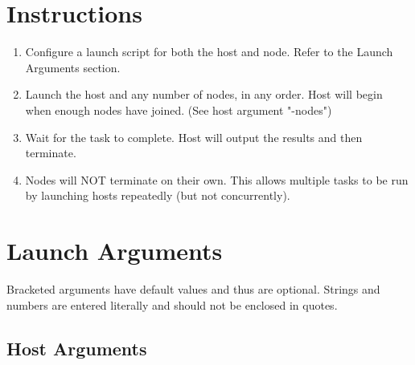 \documentclass[]{article}
\begin{document}
\section{Instructions}
\begin{enumerate}
	\item Configure a launch script for both the host and node. Refer to the Launch Arguments section.
	\item Launch the host and any number of nodes, in any order. Host will begin when enough nodes have joined. (See host argument "-nodes")
	\item Wait for the task to complete. Host will output the results and then terminate.
	\item Nodes will NOT terminate on their own. This allows multiple tasks to be run by launching hosts repeatedly (but not concurrently).
\end{enumerate}

\section{Launch Arguments}
Bracketed arguments have default values and thus are optional. Strings and numbers are entered literally and should not be enclosed in quotes.
\subsection{Host Arguments}
\end{document}
